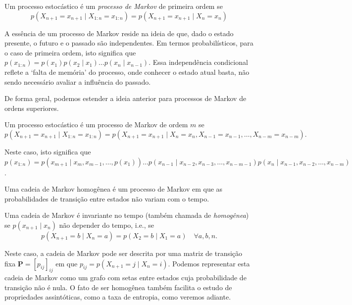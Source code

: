 \begin{definition}
  Um processo estocástico é um \emph{processo de Markov} de primeira ordem se
  \begin{equation}
     p(X_{n+1} = x_{n+1} \mid X_{1:n} = x_{1:n}) = p(X_{n+1} = x_{n+1} \mid X_n = x_n)
  \end{equation}
\end{definition}
A essência de um processo de Markov reside na ideia de que, dado o estado
presente, o futuro e o passado são independentes. Em termos probabilísticos,
para o caso de primeira ordem, isto significa que $p(x_{1:n}) = p(x_1)p(x_2 \mid x_1) \ldots p(x_n \mid x_{n-1})$.
Essa independência condicional reflete a `falta de memória' do processo,
onde conhecer o estado atual basta, não sendo necessário avaliar a influência do passado.

De forma geral, podemos estender a ideia anterior para processos de Markov
de ordens superiores.
\begin{definition}
  Um processo estocástico é um processo de Markov de ordem $m$ se
  \begin{equation}
    p(X_{n+1} = x_{n+1} \mid X_{1:n} = x_{1:n}) = p(X_{n+1} = x_{n+1} \mid X_n = x_n, X_{n-1} = x_{n-1}, \ldots , X_{n-m} = x_{n-m}) .
  \end{equation}
\end{definition}
Neste caso, isto significa que $p(x_{1:n}) = p(x_{m+1} \mid x_{m}, x_{m-1},
\ldots, p(x_1)) \ldots p(x_{n-1} \mid x_{n-2}, x_{n-3}, \ldots, x_{n-m-1})
p(x_n \mid x_{n-1}, x_{n-2}, \ldots, x_{n -m})$.


Uma cadeia de Markov homogênea é um processo de Markov em que as probabilidades
de transição entre estados não variam com o tempo.
\begin{definition}
  Uma cadeia de Markov é invariante no tempo (também chamada de \emph{homogênea}) se $p(x_{n+1} \mid x_n)$ não
  depender do tempo, i.e., se
  \begin{equation}
    p(X_{n+1} = b \mid X_{n} = a) = p(X_2 = b \mid X_1 = a) \quad \forall a,b,n .
  \end{equation}
\end{definition}
Neste caso, a cadeia de Markov pode ser descrita por uma matriz de transição fixa $\mathbf{P} = [p_{ij}]_{ij}$
em que $p_{ij} = p(X_{n+1} = j \mid X_{n} = i)$. Podemos representar esta cadeia de Markov como um grafo
com setas entre estados cuja probabilidade de transição não é nula.
O fato de ser homogênea também facilita o estudo de propriedades assintóticas,
como a taxa de entropia, como veremos adiante.

